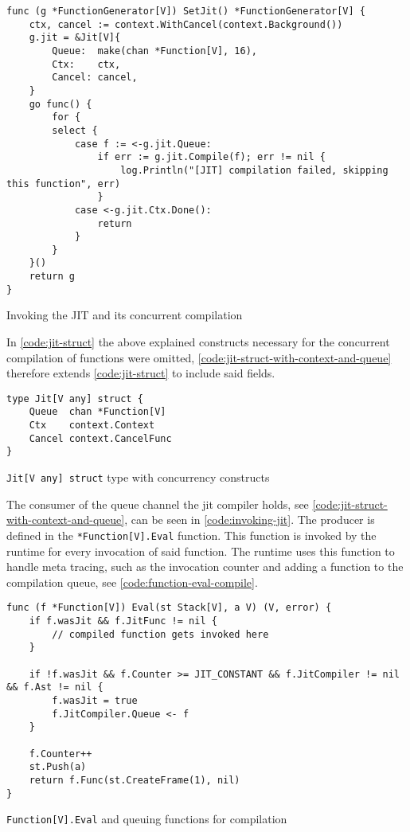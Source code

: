 \begin{listing}[H]
    \begin{verbatim}
func (g *FunctionGenerator[V]) SetJit() *FunctionGenerator[V] {
    ctx, cancel := context.WithCancel(context.Background())
    g.jit = &Jit[V]{
        Queue:  make(chan *Function[V], 16),
        Ctx:    ctx,
        Cancel: cancel,
    }
    go func() {
        for {
        select {
            case f := <-g.jit.Queue:
                if err := g.jit.Compile(f); err != nil {
                    log.Println("[JIT] compilation failed, skipping this function", err)
                }
            case <-g.jit.Ctx.Done():
                return
            }
        }
    }()
    return g
}
    \end{verbatim}
    \caption{Invoking the JIT and its concurrent compilation}
    \label{code:invoking-jit}
\end{listing}

In \autoref{code:jit-struct} the above explained constructs necessary for the
concurrent compilation of functions were omitted,
\autoref{code:jit-struct-with-context-and-queue} therefore extends
\autoref{code:jit-struct} to include said fields.

\begin{listing}[H]
    \begin{verbatim}
type Jit[V any] struct {
	Queue  chan *Function[V]
	Ctx    context.Context
	Cancel context.CancelFunc
}
    \end{verbatim}
    \caption{\texttt{Jit[V any] struct} type with concurrency constructs}
    \label{code:jit-struct-with-context-and-queue}
\end{listing}

The consumer of the queue channel the jit compiler holds, see
\autoref{code:jit-struct-with-context-and-queue}, can be seen in
\autoref{code:invoking-jit}. The producer is defined in the
\texttt{*Function[V].Eval} function. This function is invoked by the runtime
for every invocation of said function. The runtime uses this function to handle
meta tracing, such as the invocation counter and adding a function to the
compilation queue, see \autoref{code:function-eval-compile}.

\begin{listing}[H]
    \begin{verbatim}
func (f *Function[V]) Eval(st Stack[V], a V) (V, error) {
    if f.wasJit && f.JitFunc != nil {
        // compiled function gets invoked here
    }

    if !f.wasJit && f.Counter >= JIT_CONSTANT && f.JitCompiler != nil && f.Ast != nil {
        f.wasJit = true
        f.JitCompiler.Queue <- f
    }

    f.Counter++
    st.Push(a)
    return f.Func(st.CreateFrame(1), nil)
}

    \end{verbatim}
    \caption{\texttt{Function[V].Eval} and queuing functions for compilation}
    \label{code:function-eval-compile}
\end{listing}

